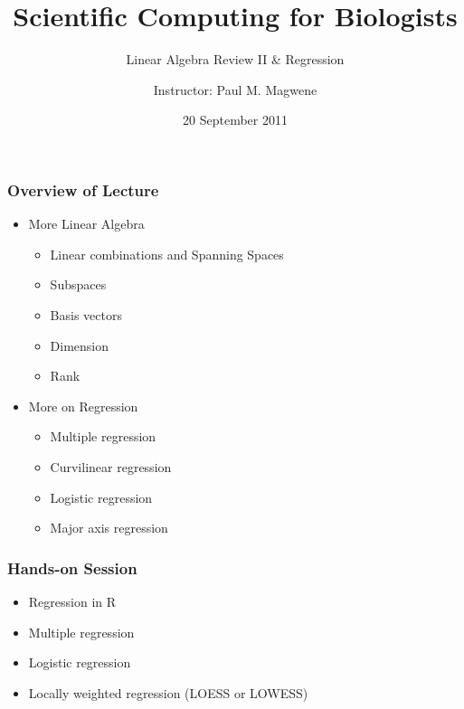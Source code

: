 \documentclass{beamer}
\title{Scientific Computing for Biologists}
\subtitle{Linear Algebra Review II \& Regression} %
\author{Instructor: Paul M. Magwene}
\date{20 September 2011}
\begin{document}
\begin{frame}
\titlepage
\end{frame}

\begin{frame}
  \frametitle{Overview of Lecture}
  
\begin{itemize}
		\item More Linear Algebra
		\begin{itemize}
			\item Linear combinations and Spanning Spaces
			\item Subspaces
			\item Basis vectors
			\item Dimension
			\item Rank			
		\end{itemize}		
		\item More on Regression
		\begin{itemize}
		  \item Multiple regression
		  \item Curvilinear regression
		  \item Logistic regression
		  \item Major axis regression  	  
		\end{itemize}		
\end{itemize}

\end{frame}

\begin{frame}
  \frametitle{Hands-on Session}
\begin{itemize}
    \item Regression in R		
		\item Multiple regression
		\item Logistic regression
		\item Locally weighted regression (LOESS or LOWESS)		
\end{itemize} 


\end{frame}		
\end{document}
